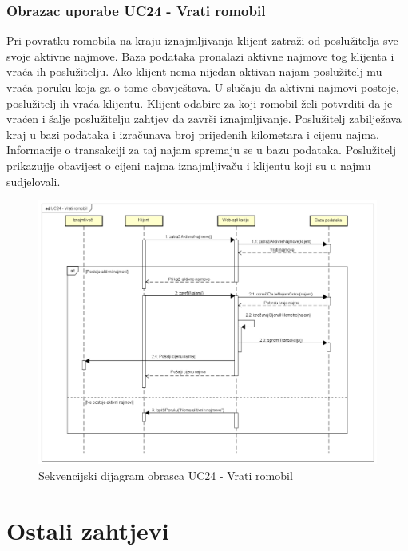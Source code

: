 				\subsubsection{Obrazac uporabe UC24 - Vrati romobil}
						Pri povratku romobila na kraju iznajmljivanja klijent zatraži od poslužitelja sve svoje aktivne najmove. Baza podataka pronalazi aktivne najmove tog klijenta i vraća ih poslužitelju. Ako klijent nema nijedan aktivan najam poslužitelj mu vraća poruku koja ga o tome obavještava. U slučaju da aktivni najmovi postoje, poslužitelj ih vraća klijentu. Klijent odabire za koji romobil želi potvrditi da je vraćen i šalje poslužitelju zahtjev da završi iznajmljivanje. Poslužitelj zabilježava kraj u bazi podataka i izračunava broj prijeđenih kilometara i cijenu najma. Informacije o transakciji za taj najam spremaju se u bazu podataka. Poslužitelj prikazujje obavijest o cijeni najma iznajmljivaču i klijentu koji su u najmu sudjelovali.
						
						\begin{figure} [H]
							
							\includegraphics[width=1\linewidth]{dijagrami/UC24 - Vrati romobil.png}
							\centering
							\caption{Sekvencijski dijagram obrasca UC24 - Vrati romobil}
							\label{fig:Sekvencijski dijagram obrasca UC24 - Vrati romobil}
						\end{figure}
				\eject
	

		\section{Ostali zahtjevi}
		
